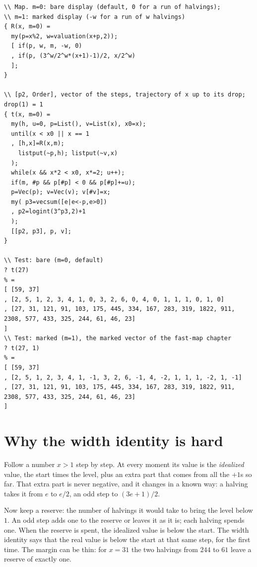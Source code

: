 \documentclass[10pt,a4paper,titlepage]{article}
\begin{document}
\begin{lstlisting}[basicstyle=\ttfamily\scriptsize, breaklines=true]
\\ Map. m=0: bare display (default, 0 for a run of halvings);
\\ m=1: marked display (-w for a run of w halvings)
{ R(x, m=0) =
  my(p=x%2, w=valuation(x+p,2));
  [ if(p, w, m, -w, 0)
  , if(p, (3^w/2^w*(x+1)-1)/2, x/2^w)
  ];
}

\\ [p2, Order], vector of the steps, trajectory of x up to its drop; drop(1) = 1
{ t(x, m=0) =
  my(h, u=0, p=List(), v=List(x), x0=x);
  until(x < x0 || x == 1
  , [h,x]=R(x,m);
    listput(~p,h); listput(~v,x)
  );
  while(x && x*2 < x0, x*=2; u++);
  if(m, #p && p[#p] < 0 && p[#p]+=u);
  p=Vec(p); v=Vec(v); v[#v]=x;
  my( p3=vecsum([e|e<-p,e>0])
  , p2=logint(3^p3,2)+1
  );
  [[p2, p3], p, v];
}

\\ Test: bare (m=0, default)
? t(27)
% =
[ [59, 37]
, [2, 5, 1, 2, 3, 4, 1, 0, 3, 2, 6, 0, 4, 0, 1, 1, 1, 0, 1, 0]
, [27, 31, 121, 91, 103, 175, 445, 334, 167, 283, 319, 1822, 911, 2308, 577, 433, 325, 244, 61, 46, 23]
]
\\ Test: marked (m=1), the marked vector of the fast-map chapter
? t(27, 1)
% =
[ [59, 37]
, [2, 5, 1, 2, 3, 4, 1, -1, 3, 2, 6, -1, 4, -2, 1, 1, 1, -2, 1, -1]
, [27, 31, 121, 91, 103, 175, 445, 334, 167, 283, 319, 1822, 911, 2308, 577, 433, 325, 244, 61, 46, 23]
]
\end{lstlisting}


\section{Why the width identity is hard}
\label{app:width}

Follow a number $x > 1$ step by step. At every moment its value is the
\emph{idealized} value, the start times the level, plus an extra part that
comes from all the $+1$s so far. That extra part is never negative, and it
changes in a known way: a halving takes it from $e$ to $e/2$, an odd step to
$(3e+1)/2$.

Now keep a reserve: the number of halvings it would take to bring the level
below $1$. An odd step adds one to the reserve or leaves it as it is; each
halving spends one. When the reserve is spent, the idealized value is below the
start. The width identity says that the real value is below the start at that same
step, for the first time. The margin can be thin: for $x = 31$ the two halvings
from $244$ to $61$ leave a reserve of exactly one.
\end{document}
